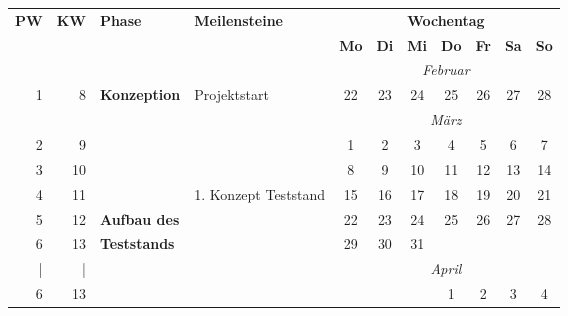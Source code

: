 \newcommand{\cellblue}[1]{\cellcolor{cyan} #1}
\begin{table}[H]
    \begin{tabular}{r r l l|c c|c c c|c c}
        \toprule
         \textbf{PW} & \textbf{KW}      & \textbf{Phase} & \textbf{Meilensteine} & \multicolumn{7}{c}{\textbf{Wochentag}} \\
                     &            &                       &                       & \textbf{Mo} & \textbf{Di} & \textbf{Mi}  & \textbf{Do} & \textbf{Fr} & \textbf{Sa} & \textbf{So} \\ \midrule
                           &                         &                       &                       & \multicolumn{7}{c}{\textit{Februar}}   \\
          1                & 8                       & \textbf{Konzeption}         & Projektstart          & 22                                      & 23 & \cellblue{24}  & 25 & 26 & 27 & 28 \\
                           &                         &                       &                       & \multicolumn{7}{c}{\textit{März}}      \\
          2                & 9                       &                       &                       & 1                                       & 2  & 3   & 4  & 5  & 6  & 7  \\
          3                & 10                      &                       &                       & 8                                       & 9  & 10  & 11 & 12 & 13 & 14 \\
          4                & 11                      &                       & 1. Konzept Teststand     & 15                                      & 16 & 17  & 18 & 19 & 20 & 21 \\
          \midrule
          5                & 12                      & \textbf{Aufbau des}          &                       & 22                                      & 23 & 24  & 25 & 26 & 27 & 28 \\
          6                & 13                      & \textbf{Teststands}            &                       & 29                                      & 30 & 31  &    &    &    &    \\
          |                & |                       &                       &                       & \multicolumn{7}{c}{\textit{April}}     \\
          6                & 13                      &                       &                       &                                         &    &     & 1  & 2  & 3  & 4  \\

\end{tabular}
\end{table}
